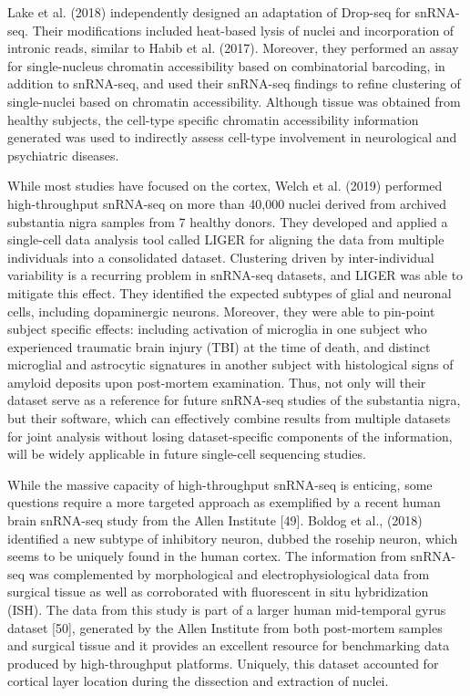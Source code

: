 \documentclass[12pt]{article}
\begin{document}
Lake et al. (2018) independently designed an adaptation of Drop-seq for snRNA-seq. Their modifications included heat-based lysis of nuclei and incorporation of intronic reads, similar to Habib et al. (2017). Moreover, they performed an assay for single-nucleus chromatin accessibility based on combinatorial barcoding, in addition to snRNA-seq, and used their snRNA-seq findings to refine clustering of single-nuclei based on chromatin accessibility. Although tissue was obtained from healthy subjects, the cell-type specific chromatin accessibility information generated was used to indirectly assess cell-type involvement in neurological and psychiatric diseases.

While most studies have focused on the cortex, Welch et al. (2019) performed high-throughput snRNA-seq on more than 40,000 nuclei derived from archived substantia nigra samples from 7 healthy donors. They developed and applied a single-cell data analysis tool called LIGER for aligning the data from multiple individuals into a consolidated dataset. Clustering driven by inter-individual variability is a recurring problem in snRNA-seq datasets, and LIGER was able to mitigate this effect. They identified the expected subtypes of glial and neuronal cells, including dopaminergic neurons. Moreover, they were able to pin-point subject specific effects: including activation of microglia in one subject who experienced traumatic brain injury (TBI) at the time of death, and distinct microglial and astrocytic signatures in another subject with histological signs of amyloid deposits upon post-mortem examination. Thus, not only will their dataset serve as a reference for future snRNA-seq studies of the substantia nigra, but their software, which can effectively combine results from multiple datasets for joint analysis without losing dataset-specific components of the information, will be widely applicable in future single-cell sequencing studies.

While the massive capacity of high-throughput snRNA-seq is enticing, some questions require a more targeted approach as exemplified by a recent human brain snRNA-seq study from the Allen Institute [49]. Boldog et al., (2018) identified a new subtype of inhibitory neuron, dubbed the rosehip neuron, which seems to be uniquely found in the human cortex. The information from snRNA-seq was complemented by morphological and electrophysiological data from surgical tissue as well as corroborated with fluorescent in situ hybridization (ISH). The data from this study is part of a larger human mid-temporal gyrus dataset [50], generated by the Allen Institute from both post-mortem samples and surgical tissue and it provides an excellent resource for benchmarking data produced by high-throughput platforms. Uniquely, this dataset accounted for cortical layer location during the dissection and extraction of nuclei.
 
\end{document}
